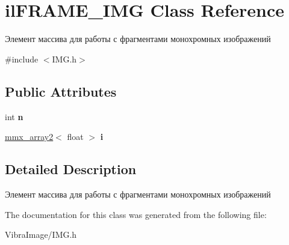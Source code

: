 \hypertarget{classil_f_r_a_m_e___i_m_g}{\section{il\+F\+R\+A\+M\+E\+\_\+\+I\+M\+G Class Reference}
\label{classil_f_r_a_m_e___i_m_g}
}


Элемент массива для работы с фрагментами монохромных изображений  




{\ttfamily \#include $<$I\+M\+G.\+h$>$}

\subsection*{Public Attributes}
\begin{DoxyCompactItemize}
\item 
\hypertarget{classil_f_r_a_m_e___i_m_g_a7925038521929135a49e1796a9703c5c}{int {\bfseries n}}\label{classil_f_r_a_m_e___i_m_g_a7925038521929135a49e1796a9703c5c}

\item 
\hypertarget{classil_f_r_a_m_e___i_m_g_ab40e301cbcb470f71bcf09db85dacccf}{\hyperlink{classmmx__array2}{mmx\+\_\+array2}$<$ float $>$ {\bfseries i}}\label{classil_f_r_a_m_e___i_m_g_ab40e301cbcb470f71bcf09db85dacccf}

\end{DoxyCompactItemize}


\subsection{Detailed Description}
Элемент массива для работы с фрагментами монохромных изображений 



The documentation for this class was generated from the following file\+:\begin{DoxyCompactItemize}
\item 
Vibra\+Image/I\+M\+G.\+h\end{DoxyCompactItemize}
